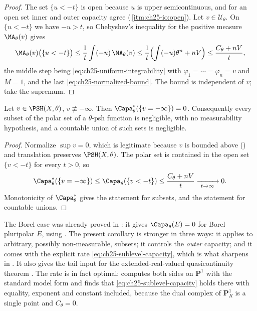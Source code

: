 \begin{proof}
The set $\{u<-t\}$ is open because $u$ is upper semicontinuous, and for
an open set inner and outer capacity agree
(\,\cref{itm:ch25-io:open}).  Let
$v\in\mathcal U_\theta$.  On $\{u<-t\}$ we have $-u>t$, so Chebyshev's
inequality for the positive measure $\MA_\theta(v)$ gives
\[
 \MA_\theta(v)\bigl(\{u<-t\}\bigr)
 \leq\frac1t\int(-u)\,\MA_\theta(v)
 \leq\frac1t\Bigl(\int(-u)\theta^n+nV\Bigr)
 \leq\frac{C_\theta+nV}{t},
\]
the middle step being \eqref{eq:ch25-uniform-integrability} with
$\varphi_1=\cdots=\varphi_n=v$ and $M=1$, and the last
\eqref{eq:ch25-normalized-bound}.  The bound is independent of $v$; take
the supremum.
\end{proof}

\begin{corollary}
\label{cor:ch25-polar-negligible}
Let $v\in\PSH(X,\theta)$, $v\not\equiv-\infty$.  Then
$\Capa^*_\theta(\{v=-\infty\})=0$.  Consequently every subset of the polar
set of a $\theta$-psh function is negligible, with no measurability
hypothesis, and a countable union of such sets is negligible.
\end{corollary}

\begin{proof}
Normalize $\sup v=0$, which is legitimate because $v$ is bounded above
() and translation preserves
$\PSH(X,\theta)$.  The polar set is contained in the open set
$\{v<-t\}$ for every $t>0$, so
\[
 \Capa^*_\theta(\{v=-\infty\})
 \leq\Capa_\theta(\{v<-t\})\leq\frac{C_\theta+nV}{t}
 \xrightarrow[\ t\to\infty\ ]{}0 .
\]
Monotonicity of $\Capa^*_\theta$ gives the statement for subsets, and
 the statement for countable unions.
\end{proof}

\begin{remark}
\label{rem:ch25-two-polar-proofs}
The Borel case was already proved in :
it gives $\Capa_\theta(E)=0$ for Borel pluripolar $E$, using
.  The present corollary is stronger in
three ways: it applies to arbitrary, possibly non-measurable, subsets; it
controls the \emph{outer} capacity; and it comes with the explicit rate
\eqref{eq:ch25-sublevel-capacity}, which is what
 sharpens in .  It also
gives the tail input for the extended-real-valued quasicontinuity theorem
.  The rate is in fact optimal:
 computes both sides on $\mathbf P^1$
with the standard model form and finds that
\eqref{eq:ch25-sublevel-capacity} holds there with equality, exponent and
constant included, because the dual complex of $\mathbf P^1_R$ is a single
point and $C_\theta=0$.
\end{remark}

